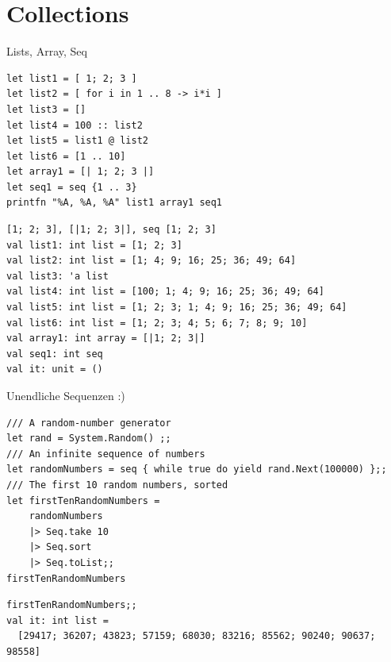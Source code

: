 \documentclass[t]{beamer}
\begin{document}
\section{Collections }
\label{sec:org4f2c1d3}

\begin{frame}[label={sec:org84e12cf},fragile]{Lists, Array, Seq}
 \scriptsize

\begin{verbatim}
let list1 = [ 1; 2; 3 ]
let list2 = [ for i in 1 .. 8 -> i*i ]
let list3 = []
let list4 = 100 :: list2
let list5 = list1 @ list2
let list6 = [1 .. 10]
let array1 = [| 1; 2; 3 |]
let seq1 = seq {1 .. 3}
printfn "%A, %A, %A" list1 array1 seq1
\end{verbatim}

\begin{verbatim}
[1; 2; 3], [|1; 2; 3|], seq [1; 2; 3]
val list1: int list = [1; 2; 3]
val list2: int list = [1; 4; 9; 16; 25; 36; 49; 64]
val list3: 'a list
val list4: int list = [100; 1; 4; 9; 16; 25; 36; 49; 64]
val list5: int list = [1; 2; 3; 1; 4; 9; 16; 25; 36; 49; 64]
val list6: int list = [1; 2; 3; 4; 5; 6; 7; 8; 9; 10]
val array1: int array = [|1; 2; 3|]
val seq1: int seq
val it: unit = ()
\end{verbatim}
\end{frame}

\begin{frame}[label={sec:org71a47af},fragile]{Unendliche Sequenzen :)}
 \begin{verbatim}
/// A random-number generator 
let rand = System.Random() ;;
/// An infinite sequence of numbers
let randomNumbers = seq { while true do yield rand.Next(100000) };;
/// The first 10 random numbers, sorted
let firstTenRandomNumbers = 
    randomNumbers
    |> Seq.take 10 
    |> Seq.sort
    |> Seq.toList;;
firstTenRandomNumbers
\end{verbatim}

\begin{verbatim}
firstTenRandomNumbers;;
val it: int list =
  [29417; 36207; 43823; 57159; 68030; 83216; 85562; 90240; 90637; 98558]
\end{verbatim}
\end{frame}
\end{document}

